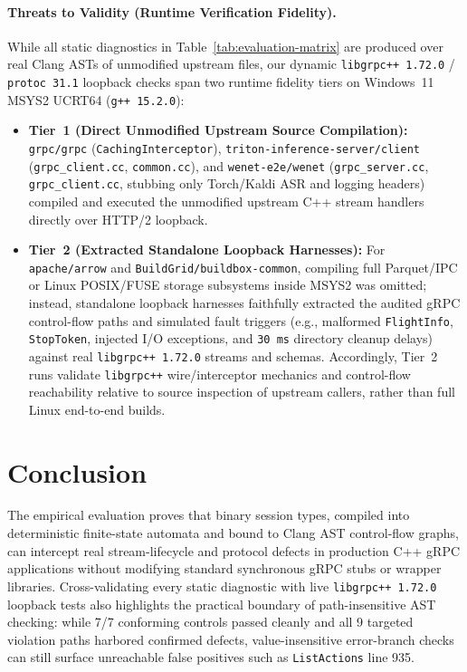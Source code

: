 \documentclass[11pt,a4paper]{article}
\begin{document}
\paragraph{Threats to Validity (Runtime Verification Fidelity).}
While all static diagnostics in Table~\ref{tab:evaluation-matrix} are produced over real Clang ASTs of unmodified upstream files, our dynamic \texttt{libgrpc++ 1.72.0} / \texttt{protoc 31.1} loopback checks span two runtime fidelity tiers on Windows~11 MSYS2 UCRT64 (\texttt{g++ 15.2.0}):
\begin{itemize}
    \item \textbf{Tier~1 (Direct Unmodified Upstream Source Compilation):} \texttt{grpc/grpc} (\texttt{CachingInterceptor}), \texttt{triton-inference-server/client} (\texttt{grpc\_client.cc}, \texttt{common.cc}), and \texttt{wenet-e2e/wenet} (\texttt{grpc\_server.cc}, \texttt{grpc\_client.cc}, stubbing only Torch/Kaldi ASR and logging headers) compiled and executed the unmodified upstream C++ stream handlers directly over HTTP/2 loopback.
    \item \textbf{Tier~2 (Extracted Standalone Loopback Harnesses):} For \texttt{apache/arrow} and \texttt{BuildGrid/buildbox-common}, compiling full Parquet/IPC or Linux POSIX/FUSE storage subsystems inside MSYS2 was omitted; instead, standalone loopback harnesses faithfully extracted the audited gRPC control-flow paths and simulated fault triggers (e.g., malformed \texttt{FlightInfo}, \texttt{StopToken}, injected I/O exceptions, and \texttt{30\,ms} directory cleanup delays) against real \texttt{libgrpc++ 1.72.0} streams and schemas. Accordingly, Tier~2 runs validate \texttt{libgrpc++} wire/interceptor mechanics and control-flow reachability relative to source inspection of upstream callers, rather than full Linux end-to-end builds.
\end{itemize}

\section{Conclusion}

The empirical evaluation proves that binary session types, compiled into deterministic finite-state automata and bound to Clang AST control-flow graphs, can intercept real stream-lifecycle and protocol defects in production C++ gRPC applications without modifying standard synchronous gRPC stubs or wrapper libraries. Cross-validating every static diagnostic with live \texttt{libgrpc++ 1.72.0} loopback tests also highlights the practical boundary of path-insensitive AST checking: while 7/7 conforming controls passed cleanly and all 9 targeted violation paths harbored confirmed defects, value-insensitive error-branch checks can still surface unreachable false positives such as \texttt{ListActions} line 935.
\end{document}
